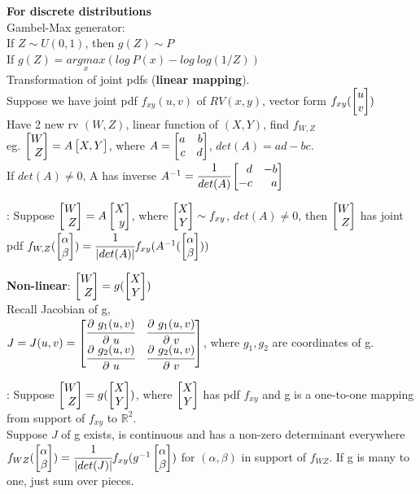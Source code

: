 \documentclass[12pt,a4paper]{article}
\begin{document}
\vspace{0.5cm}
\textbf{For discrete distributions}\\
Gambel-Max generator: \\
If $Z\sim U(0,1)$, then $g(Z)\sim P$\\
If $g(Z) = \underset{x}{argmax}(log\ P(x)-log\ log(1/Z))$\\

Transformation of joint pdfs (\textbf{linear mapping}).\\
Suppose we have joint pdf $f_{xy}(u,v)$ of $RV(x,y)$, vector form $f_{xy}(\vecb{u\\v})$ \\
Have 2 new rv $(W, Z)$, linear function of $(X,Y)$, find $f_{W,Z}$\\ 
eg. $\vecb{W\\Z}=A\vecb{X,Y}$, where $A=\vecb{a&b\\c&d}$, $det(A)=ad-bc$.\\ 
If $det(A)\neq 0$, A has inverse $A^{-1}=\cfrac{1}{det(A)}\vecb{d&-b\\-c&a}$

\thm: Suppose $\vecb{W\\Z}=A\vecb{X\\y}$, where $\vecb{X\\Y}\sim f_{xy}$, $det(A)\neq 0$, then $\vecb{W\\Z}$ has joint pdf $f_{W,Z}(\vecb{\alpha\\\beta})=\cfrac{1}{|det(A)|}f_{xy}(A^{-1}(\vecb{\alpha\\\beta}))$

\vspace{0.5cm}
\textbf{Non-linear}: $\vecb{W\\Z}=g(\vecb{X\\Y})$\\
Recall Jacobian of g, \\
$J=J(u,v)=\vecb{\pfrac{g_1(u,v)}{u} & \pfrac{g_1(u,v)}{v}\\
\pfrac{g_2(u,v)}{u} & \pfrac{g_2(u,v)}{v}}$, where $g_1, g_2$ are coordinates of g.

\thm: Suppose $\vecb{W\\Z}=g(\vecb{X\\Y})$, where $\vecb{X\\Y}$ has pdf $f_{xy}$ and g is a one-to-one mapping from support of $f_{xy}$ to $\mathbb{R}^2$. \\
Suppose $J$ of g exists, is continuous and has a non-zero determinant everywhere\\
$f_{WZ}(\vecab)=\cfrac{1}{|det(J)|}f_{xy}(g^{-1}\vecab)$ for $(\alpha,\beta)$ in support of $f_{WZ}$. If g is many to one, just sum over pieces. 
\end{document}
